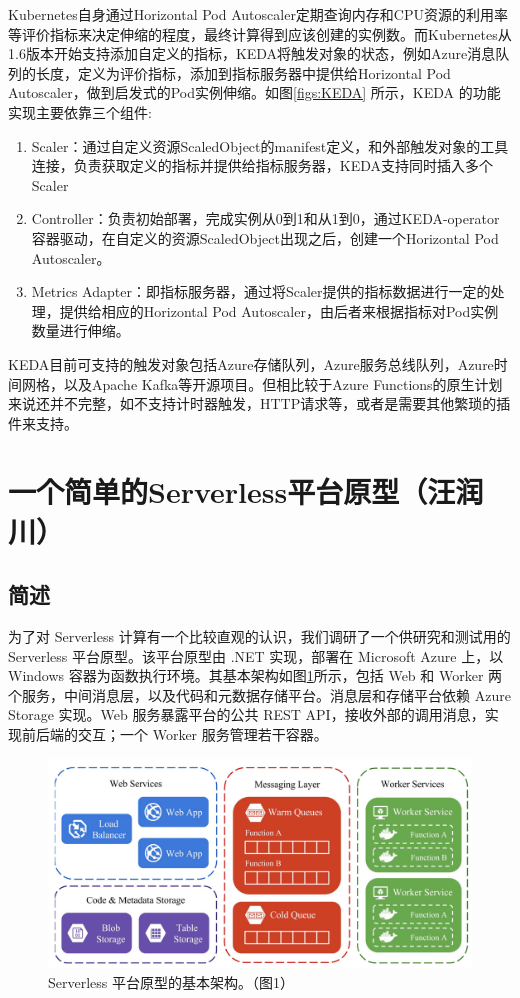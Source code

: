 \documentclass[11pt]{article}
\begin{document}
Kubernetes自身通过Horizo​​ntal Pod Autoscaler定期查询内存和CPU资源的利用率等评价指标来决定伸缩的程度，最终计算得到应该创建的实例数。而Kubernetes从1.6版本开始支持添加自定义的指标，KEDA将触发对象的状态，例如Azure消息队列的长度，定义为评价指标，添加到指标服务器中提供给Horizo​​ntal Pod Autoscaler，做到启发式的Pod实例伸缩。如图\ref{figs:KEDA} 所示，KEDA 的功能实现主要依靠三个组件:
\begin{enumerate}
	\item Scaler：通过自定义资源ScaledObject的manifest定义，和外部触发对象的工具连接，负责获取定义的指标并提供给指标服务器，KEDA支持同时插入多个Scaler
	\item Controller：负责初始部署，完成实例从0到1和从1到0，通过KEDA-operator容器驱动，在自定义的资源ScaledObject出现之后，创建一个Horizo​​ntal Pod Autoscaler。
	\item Metrics Adapter：即指标服务器，通过将Scaler提供的指标数据进行一定的处理，提供给相应的Horizo​​ntal Pod Autoscaler，由后者来根据指标对Pod实例数量进行伸缩。
\end{enumerate}
KEDA目前可支持的触发对象包括Azure存储队列，Azure服务总线队列，Azure时间网格，以及Apache Kafka等开源项目。但相比较于Azure Functions的原生计划来说还并不完整，如不支持计时器触发，HTTP请求等，或者是需要其他繁琐的插件来支持。

\section{一个简单的Serverless平台原型（汪润川）}
\subsection{简述}
为了对 Serverless 计算有一个比较直观的认识，我们调研了一个供研究和测试用的 Serverless 平台原型\cite{mcgrath2017serverless}。该平台原型由 .NET 实现，部署在 Microsoft Azure 上，以 Windows 容器为函数执行环境。其基本架构如图\ref{figs:mcgrath2017_structure}所示，包括 Web 和 Worker 两个服务，中间消息层，以及代码和元数据存储平台。消息层和存储平台依赖 Azure Storage 实现。Web 服务暴露平台的公共 REST API，接收外部的调用消息，实现前后端的交互；一个 Worker 服务管理若干容器。
\begin{figure}[!htbp]
	\centering
	\includegraphics[width=1.0\linewidth]{figs/2017serverless_structure}
	\caption{Serverless 平台原型的基本架构。（\cite{mcgrath2017serverless}图1）}
	\label{figs:mcgrath2017_structure}
\end{figure}
\end{document}
